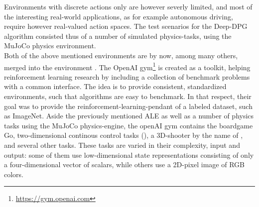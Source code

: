 Environments with discrete actions only are however severly limited, and most of the interesting real-world applications, as for example autonomous driving, require however real-valued action spaces. The test scenarios for the Deep-DPG algorithm consisted thus of a number of simulated physics-tasks, using the MuJoCo physics environment. \\

\noindent Both of the above mentioned environments are by now, among many others, merged into the  environment \cite{brockman_openai_2016}. The OpenAI gym\footnote{\url{https://gym.openai.com}} is created as a toolkit, helping reinforcement learning research by including a collection of benchmark problems with a common interface. The idea is to provide consistent, standardized environments, such that algorithms are easy to benchmark. In that respect, their goal was to provide the reinforcement-learning-pendant of a labeled dataset, such as ImageNet. Aside the previously mentioned ALE as well as a number of physics tasks using the MuJoCo physics-engine, the openAI gym contains the boardgame Go, two-dimensional continous control tasks (), a 3D-shooter by the name of , and several other tasks. These tasks are varied in their complexity, input and output: some of them use low-dimensional state representations consisting of only a four-dimensional vector of scalars, while others use a 2D-pixel image of RGB colors.  

